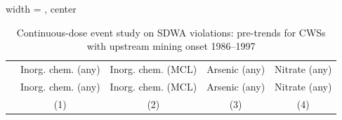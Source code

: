 
\begin{table}[htbp]
   
   \caption{\label{tab:pt_eventstudy_violations} Continuous-dose event study on SDWA violations: pre-trends for CWSs with upstream mining onset 1986--1997}
   \bigskip
   
   \centering
   
   \begin{adjustbox}{width = \textwidth, center}
      
      
      \begin{tabular}{lcccc}
         \toprule
         
                                                      & Inorg. chem. (any) & Inorg. chem. (MCL) & Arsenic (any) & Nitrate (any)\\  
         
                                                      & Inorg. chem. (any) & Inorg. chem. (MCL) & Arsenic (any) & Nitrate (any) \\   
         
                                                      & (1)                & (2)                & (3)           & (4)\\  
         

\end{tabular}
\end{adjustbox}
\end{table}
